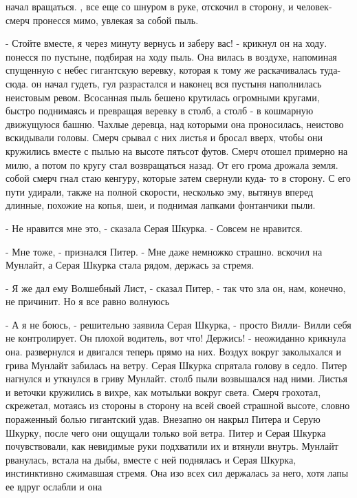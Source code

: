 начал вращаться.
, все еще со шнуром в руке, отскочил в сторону, и человек-
смерч пронесся мимо, увлекая за собой пыль.
\par- Стойте вместе, я через минуту вернусь и заберу вас! - крикнул он 
на ходу.
 понесся по пустыне, подбирая на ходу пыль. Она вилась в 
воздухе, напоминая спущенную с небес гигантскую веревку, которая к 
тому же раскачивалась туда-сюда.
 он начал гудеть, гул разрастался и наконец вся пустыня 
наполнилась неистовым ревом. Всосанная пыль бешено крутилась огромными 
кругами, быстро поднимаясь и превращая веревку в столб, а столб - в 
кошмарную движущуюся башню. Чахлые деревца, над которыми она 
проносилась, неистово вскидывали головы. Смерч срывал с них листья и 
бросал вверх, чтобы они кружились вместе с пылью на высоте пятьсот 
футов. Смерч отошел примерно на милю, а потом по кругу стал 
возвращаться назад. От его грома дрожала земля.
 собой смерч гнал стаю кенгуру, которые затем свернули куда-
то в сторону. С его пути удирали, также на полной скорости, несколько 
эму, вытянув вперед длинные, похожие на копья, шеи, и поднимая лапками 
фонтанчики пыли.
\par- Не нравится мне это, - сказала Серая Шкурка. - Совсем не 
нравится.
\par- Мне тоже, - признался Питер. - Мне даже немножко страшно.
 вскочил на Мунлайт, а Серая Шкурка стала рядом, держась за 
стремя.
\par- Я же дал ему Волшебный Лист, - сказал Питер, - так что зла он, 
нам, конечно, не причинит. Но я все равно волнуюсь
\par- А я не боюсь, - решительно заявила Серая Шкурка, - просто Вилли-
Вилли себя не контролирует. Он плохой водитель, вот что! Держись! - 
неожиданно крикнула она.
 развернулся и двигался теперь прямо на них. Воздух вокруг 
заколыхался и грива Мунлайт забилась на ветру. Серая Шкурка спрятала 
голову в седло. Питер нагнулся и уткнулся в гриву Мунлайт.
 столб пыли возвышался над ними. Листья и веточки 
кружились в вихре, как мотыльки вокруг света. Смерч грохотал, 
скрежетал, мотаясь из стороны в сторону на всей своей страшной высоте, 
словно пораженный болью гигантский удав. Внезапно он накрыл Питера и 
Серую Шкурку, после чего они ощущали только вой ветра.
 Питер и Серая Шкурка почувствовали, как невидимые руки 
подхватили их и втянули внутрь. Мунлайт рванулась, встала на дыбы, 
вместе с ней поднялась и Серая Шкурка, инстинктивно сжимавшая стремя. 
Она изо всех сил держалась за него, хотя лапы ее вдруг ослабли и она 

